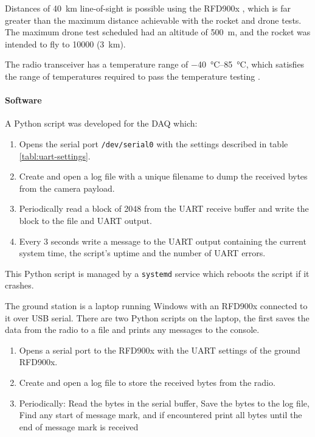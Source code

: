 \documentclass[draft]{report}
\begin{document}
Distances of \SI{40}{\kilo\metre} line-of-sight is possible using the RFD900x \cite{rfdesign2020rfd900x}, which is far greater than the maximum distance achievable with the rocket and drone tests. The maximum drone test scheduled had an altitude of \SI{500}{\metre}, and the rocket was intended to fly to \SI{10000}{\feet} (\SI{3}{\kilo\metre}).




The radio transceiver has a temperature range of \SIrange{-40}{85}{\degreeCelsius}, which satisfies the range of temperatures required to pass the temperature testing \cite{rfdesign2020rfd900x}.


\paragraph{Software}

A Python script was developed for the DAQ which:

\begin{enumerate}
  \item Opens the serial port \texttt{/dev/serial0} with the settings described in table \ref{tabl:uart-settings}.
  \item Create and open a log file with a unique filename to dump the received bytes from the camera payload.
  \item Periodically read a block of 2048 from the UART receive buffer and write the block to the file and UART output.
  \item Every 3 seconds write a message to the UART output containing the current system time, the script's uptime and the number of UART errors.
\end{enumerate}

This Python script is managed by a \texttt{systemd} service which reboots the script if it crashes.

The ground station is a laptop running Windows with an RFD900x connected to it over USB serial. There are two Python scripts on the laptop, the first saves the data from the radio to a file and prints any messages to the console.

\begin{enumerate}
  \item Opens a serial port to the RFD900x with the UART settings of the ground RFD900x.
  \item Create and open a log file to store the received bytes from the radio.
  \item Periodically:
        \subitem Read the bytes in the serial buffer,
        \subitem Save the bytes to the log file,
        \subitem Find any start of message mark, and if encountered print all bytes until the end of message mark is received
\end{enumerate}
\end{document}
